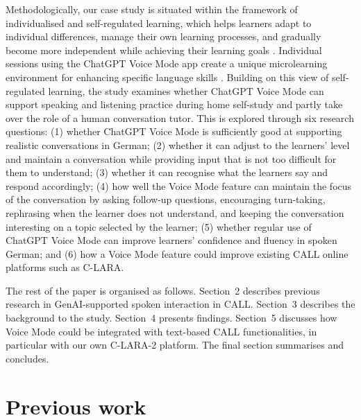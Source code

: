 \documentclass[11pt,a4paper]{article}
\begin{document}
Methodologically, our case study is situated within the framework of individualised and self-regulated learning, which helps learners adapt to individual differences, manage their own learning processes, and gradually become more independent while achieving their learning goals \citep{Zimmerman2002}. Individual sessions using the ChatGPT Voice Mode app create a unique microlearning environment for enhancing specific language skills \citep{KohnkeMoorhouse2026}. Building on this view of self-regulated learning, the study examines whether ChatGPT Voice Mode can support speaking and listening practice during home self-study and partly take over the role of a human conversation tutor. This is explored through six research questions: (1) whether ChatGPT Voice Mode is sufficiently good at supporting realistic conversations in German; (2) whether it can adjust to the learners' level and maintain a conversation while providing input that is not too difficult for them to understand; (3) whether it can recognise what the learners say and respond accordingly; (4) how well the Voice Mode feature can maintain the focus of the conversation by asking follow-up questions, encouraging turn-taking, rephrasing when the learner does not understand, and keeping the conversation interesting on a topic selected by the learner; (5) whether regular use of ChatGPT Voice Mode can improve learners' confidence and fluency in spoken German; and (6) how a Voice Mode feature could improve existing CALL online platforms such as C-LARA.

The rest of the paper is organised as follows. Section~2 describes previous research in GenAI-supported spoken interaction in CALL. Section~3 describes the background to the study. Section~4 presents findings. Section~5 discusses how Voice Mode could be integrated with text-based CALL functionalities, in particular with our own C-LARA-2 platform. The final section summarises and concludes.

\section{Previous work}
\end{document}
